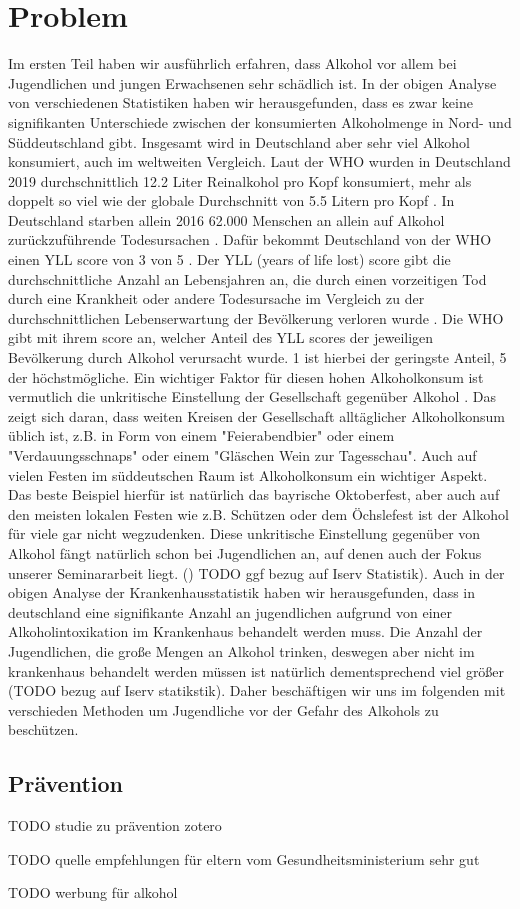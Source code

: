 \documentclass[12pt]{article}
\begin{document}
\section{Problem}
Im ersten Teil haben wir ausführlich erfahren, dass Alkohol vor allem bei Jugendlichen und jungen Erwachsenen sehr schädlich ist. 
In der obigen Analyse von verschiedenen Statistiken haben wir herausgefunden, dass es zwar keine signifikanten Unterschiede zwischen der konsumierten Alkoholmenge in Nord- und Süddeutschland gibt. Insgesamt wird in Deutschland aber sehr viel Alkohol konsumiert, auch im weltweiten Vergleich. Laut der WHO wurden in Deutschland 2019 durchschnittlich 12.2 Liter Reinalkohol pro Kopf konsumiert, mehr als doppelt so viel wie der globale Durchschnitt von 5.5 Litern pro Kopf \autocite{noauthor_alcohol_nodate-1}. In Deutschland starben allein 2016 62.000 Menschen an allein auf Alkohol zurückzuführende Todesursachen \autocite{noauthor_alkoholkonsum_nodate}. Dafür bekommt Deutschland von der WHO einen YLL score von 3 von 5 \autocite{noauthor_alcohol-attributable_nodate }. Der YLL (years of life lost) score gibt die durchschnittliche Anzahl an Lebensjahren an, die durch einen vorzeitigen Tod durch eine Krankheit oder andere Todesursache im Vergleich zu der durchschnittlichen Lebenserwartung der Bevölkerung verloren wurde \autocite{martinez_reflection_2019}. Die WHO gibt mit ihrem score an, welcher Anteil des YLL scores der jeweiligen Bevölkerung durch Alkohol verursacht wurde. 1 ist hierbei der geringste Anteil, 5 der höchstmögliche.
Ein wichtiger Faktor für diesen hohen Alkoholkonsum ist vermutlich die unkritische Einstellung der Gesellschaft gegenüber Alkohol \autocite{noauthor_alkoholkonsum_nodate}. Das zeigt sich daran, dass weiten Kreisen der Gesellschaft alltäglicher Alkoholkonsum üblich ist, z.B. in Form von einem "Feierabendbier" oder einem "Verdauungsschnaps" oder einem "Gläschen Wein zur Tagesschau". Auch auf vielen Festen im süddeutschen Raum ist Alkoholkonsum ein wichtiger Aspekt. Das beste Beispiel hierfür ist natürlich das bayrische Oktoberfest, aber auch auf den meisten lokalen Festen wie z.B. Schützen oder dem Öchslefest ist der Alkohol für viele gar nicht wegzudenken. Diese unkritische Einstellung gegenüber von Alkohol fängt natürlich schon bei Jugendlichen an, auf denen auch der Fokus unserer Seminararbeit liegt. () TODO ggf bezug auf Iserv Statistik). Auch in der obigen Analyse der Krankenhausstatistik haben wir herausgefunden, dass in deutschland eine signifikante Anzahl an jugendlichen aufgrund von einer Alkoholintoxikation im Krankenhaus behandelt werden muss. Die Anzahl der Jugendlichen, die große Mengen an Alkohol trinken, deswegen aber nicht im krankenhaus behandelt werden müssen ist natürlich dementsprechend viel größer (TODO bezug auf Iserv statikstik). Daher beschäftigen wir uns im folgenden mit verschieden Methoden um Jugendliche vor der Gefahr des Alkohols zu beschützen. 

\subsection{Prävention}

TODO studie zu prävention zotero

TODO quelle empfehlungen für eltern vom Gesundheitsministerium sehr gut

TODO werbung für alkohol
\printbibliography
\end{document}
